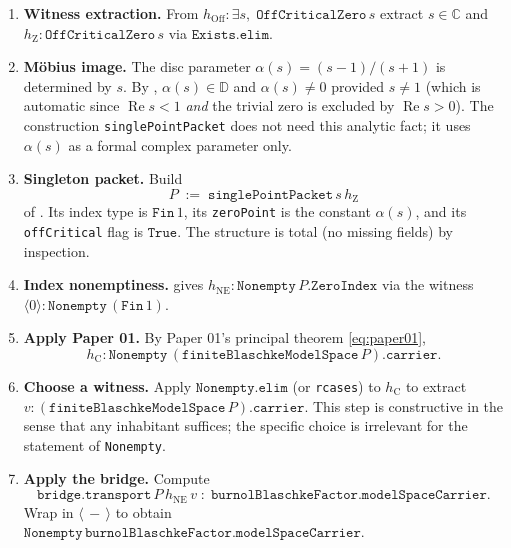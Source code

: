 \documentclass[12pt]{article}
\theoremstyle{definition}
\theoremstyle{remark}
\newcommand{\C}{\mathbb{C}}
\newcommand{\Disc}{\mathbb{D}}
\newcommand{\re}{\operatorname{Re}}
\begin{document}
\begin{enumerate}[label=\textbf{Step \arabic*.},leftmargin=2em]
\item \textbf{Witness extraction.} From
\(
h_{\text{Off}} : \exists s,\;\texttt{OffCriticalZero}\,s
\)
extract $s\in\C$ and $h_{\text{Z}} : \texttt{OffCriticalZero}\,s$ via
$\texttt{Exists.elim}$.

\item \textbf{Möbius image.} The disc parameter $\alpha(s) = (s-1)/(s+1)$
is determined by $s$. By , $\alpha(s)\in\Disc$ and
$\alpha(s)\neq 0$ provided $s\neq 1$ (which is automatic since
$\re s < 1$ \emph{and} the trivial zero is excluded by
$\re s > 0$). The construction \texttt{singlePointPacket} does not need
this analytic fact; it uses $\alpha(s)$ as a formal complex parameter
only.

\item \textbf{Singleton packet.} Build
\[
P \;:=\; \texttt{singlePointPacket}\,s\,h_{\text{Z}}
\]
of . Its index type is $\texttt{Fin}\,1$, its
\texttt{zeroPoint} is the constant $\alpha(s)$, and its \texttt{offCritical}
flag is $\texttt{True}$. The structure is total (no missing fields) by
inspection.

\item \textbf{Index nonemptiness.}  gives
$h_{\text{NE}} :\texttt{Nonempty}\,P.\texttt{ZeroIndex}$ via the witness
$\langle 0\rangle:\texttt{Nonempty}\,(\texttt{Fin}\,1)$.

\item \textbf{Apply Paper 01.} By Paper 01's principal theorem
\eqref{eq:paper01},
\[
h_{\text{C}} :\texttt{Nonempty}\,
(\texttt{finiteBlaschkeModelSpace}\,P).\texttt{carrier}.
\]

\item \textbf{Choose a witness.} Apply
$\texttt{Nonempty.elim}$ (or \texttt{rcases}) to $h_{\text{C}}$ to
extract $v : (\texttt{finiteBlaschkeModelSpace}\,P).\texttt{carrier}$.
This step is constructive in the sense that any inhabitant suffices; the
specific choice is irrelevant for the statement of \texttt{Nonempty}.

\item \textbf{Apply the bridge.} Compute
\[
\texttt{bridge.transport}\,P\,h_{\text{NE}}\,v
\;:\;
\texttt{burnolBlaschkeFactor.modelSpaceCarrier}.
\]
Wrap in $\langle\,-\,\rangle$ to obtain
$\texttt{Nonempty}\,\texttt{burnolBlaschkeFactor.modelSpaceCarrier}$.
\end{enumerate}
\end{document}
